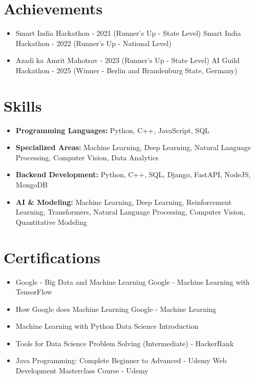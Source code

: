 \documentclass[a4paper,10pt]{article}
\begin{document}
\section*{Achievements}
\begin{itemize}
\item Smart India Hackathon - 2021 (Runner's Up - State Level) \hfill Smart India Hackathon - 2022 (Runner's Up - National Level)
\item Azadi ka Amrit Mahotsav - 2023 (Runner's Up - State Level) \hfill AI Guild Hackathon - 2025 (Winner - Berlin and Brandenburg State, Germany)
\end{itemize}

\section*{Skills}
\begin{itemize}
  \item \textbf{Programming Languages:} Python, C++, JavaScript, SQL
  \item \textbf{Specialized Areas:} Machine Learning, Deep Learning, Natural Language Processing, Computer Vision, Data Analytics
  \item \textbf{Backend Development:} Python, C++, SQL, Django, FastAPI, NodeJS, MongoDB
  \item \textbf{AI \& Modeling:} Machine Learning, Deep Learning, Reinforcement Learning, Transformers, Natural Language Processing, Computer Vision, Quantitative Modeling
\end{itemize}

\section*{Certifications}
\begin{itemize}
\item Google - Big Data and Machine Learning \hfill Google - Machine Learning with TensorFlow
\item How Google does Machine Learning \hfill Google - Machine Learning
\item Machine Learning with Python \hfill Data Science Introduction
\item Tools for Data Science \hfill Problem Solving (Intermediate) - HackerRank
\item Java Programming: Complete Beginner to Advanced - Udemy \hfill Web Development Masterclass Course - Udemy
\end{itemize}
\end{document}
